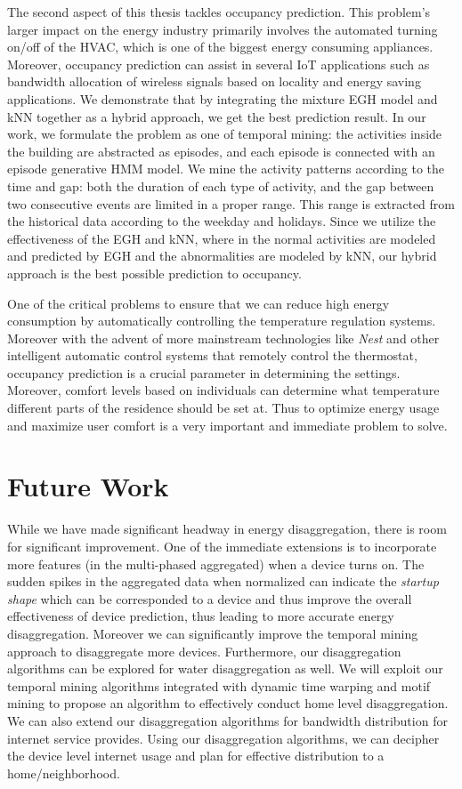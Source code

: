 The second aspect of this thesis tackles occupancy prediction. This problem's larger impact on the energy industry primarily involves the automated turning on/off of the HVAC, which is one of the biggest energy consuming appliances. Moreover, occupancy prediction can assist in several IoT applications such as bandwidth allocation of wireless signals based on locality and energy saving applications.
We demonstrate that by integrating the mixture EGH model and 
kNN together as a hybrid approach, we get the best prediction result. In our work, we formulate the problem as one of temporal mining: the activities inside the building are abstracted as episodes, and each episode is connected with an episode generative HMM model. We mine the activity patterns according to the time and gap: both the duration of each type of activity, and the gap between two consecutive events are limited in a proper range. 
This range is extracted from the historical data according to the weekday and holidays. Since we utilize the effectiveness of the EGH and kNN, where in the normal activities are modeled and predicted by EGH and the abnormalities are modeled by kNN, our hybrid approach is the best possible prediction to occupancy.

One of the critical problems to ensure that we can reduce high energy consumption by automatically controlling the temperature regulation systems. Moreover with the advent of more mainstream technologies like \emph{Nest} and other intelligent automatic control systems that remotely control the thermostat, occupancy prediction is a crucial parameter in determining the settings. Moreover, comfort levels based on individuals can determine what temperature different parts of the residence should be set at. Thus to optimize energy usage and maximize user comfort is a very important and immediate problem to solve.


\section{Future Work}
While we have made significant headway in energy disaggregation, there is room for significant improvement. One of the immediate extensions is to incorporate more features (in the multi-phased aggregated) when a device turns on. The sudden spikes in the aggregated data when normalized can indicate the \emph{startup shape} which can be corresponded to a device and thus improve the overall effectiveness of device prediction, thus leading to more accurate energy disaggregation. Moreover we can significantly improve the temporal mining approach to disaggregate more devices. Furthermore, our disaggregation algorithms can be explored for water disaggregation as well. We will exploit our temporal mining algorithms integrated with dynamic time warping and motif mining to propose an algorithm to effectively conduct home level disaggregation. We can also extend our disaggregation algorithms for bandwidth distribution for internet service provides. Using our disaggregation algorithms, we can decipher the device level internet usage and plan for effective distribution to a home/neighborhood. 

